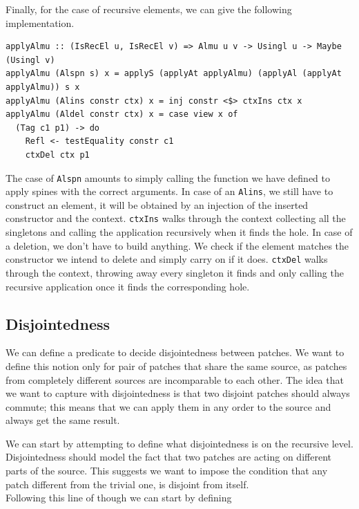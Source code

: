 \documentclass[11pt, titlepage]{article}
\newcommand{\toHaskell}[1]{\texttt{#1}\xspace}
\newcommand{\alins}{\toHaskell{Alins}}
\newcommand{\alspn}{\toHaskell{Alspn}}
\begin{document}
Finally, for the case of recursive elements, we can give the following 
implementation.

\begin{verbatim}
applyAlmu :: (IsRecEl u, IsRecEl v) => Almu u v -> Usingl u -> Maybe (Usingl v)
applyAlmu (Alspn s) x = applyS (applyAt applyAlmu) (applyAl (applyAt applyAlmu)) s x
applyAlmu (Alins constr ctx) x = inj constr <$> ctxIns ctx x
applyAlmu (Aldel constr ctx) x = case view x of
  (Tag c1 p1) -> do
    Refl <- testEquality constr c1
    ctxDel ctx p1
\end{verbatim}

The case of \alspn amounts to simply calling the function we have defined to 
apply spines with the correct arguments.
In case of an \alins, we still have to construct an element, it will be obtained
by an injection of the inserted constructor and the context. 
\texttt{ctxIns} walks through the context collecting all the singletons and 
calling the application recursively when it finds the hole.
In case of a deletion, we don't have to build anything. We check if the element 
matches the constructor we intend to delete and simply carry on if it does.
\texttt{ctxDel} walks through the context, throwing away every singleton it 
finds and only calling the recursive application once it finds the corresponding 
hole.

\subsection{Disjointedness}\label{disj}

We can define a predicate to decide disjointedness between patches. We want to define this notion only for pair of patches that share the same source, as patches from completely different sources are incomparable to each other. 
The idea that we want to capture with disjointedness is that two disjoint patches should always commute; this means that we can apply them in any order to the source and always get the same result.

We can start by attempting to define what disjointedness is on the recursive 
level.  Disjointedness should model the fact that two patches are acting on different parts of the source. This suggests we want to impose the condition that any patch different from the trivial one, is disjoint from itself.  
\\
Following this line of though we can start by defining
\end{document}
